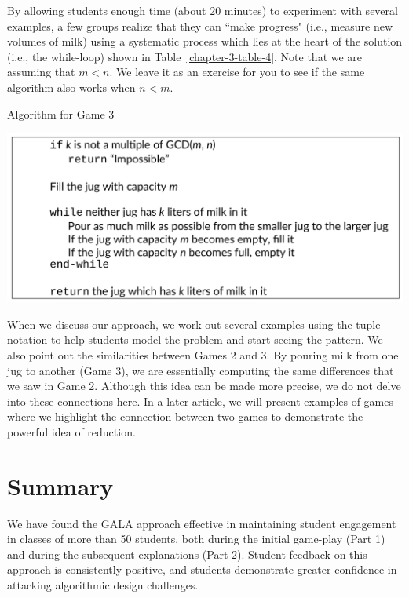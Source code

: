 \begin{multicols}{2}
By allowing students enough time (about 20 minutes) to experiment with several examples, a few groups realize that they can ``make progress" (i.e., measure new volumes of milk) using a systematic process which lies at the heart of the solution (i.e., the while-loop) shown in Table~\ref{chapter-3-table-4}. Note that we are assuming that $m < n$. We leave it as an exercise for you to see if the same algorithm also works when $n < m$.

\begin{table}[H]

\vspace{-.3cm}

\centering
\caption{Algorithm for Game 3}\label{chapter-3-table-4}
\includegraphics[scale=.6]{src/Figures/chap2/table4.jpg}
\end{table}

\vspace{-.5cm}

When we discuss our approach, we work out several examples using the tuple notation to help students model the problem and start seeing the pattern. We also point out the similarities between Games 2 and 3. By pouring milk from one jug to another (Game 3), we are essentially computing the same differences that we saw in Game 2. Although this idea can be made more precise, we do not delve into these connections here. In a later article, we will present examples of games where we highlight the connection between two games to demonstrate the powerful idea of reduction.

\vspace{-.3cm}

\section{Summary}

\vspace{-.2cm}

We have found the GALA approach effective in maintaining student engagement in classes of more than 50 students, both during the initial game-play (Part 1) and during the subsequent explanations (Part 2). Student feedback on this approach is consistently positive, and students demonstrate greater confidence in attacking algorithmic design challenges.


\end{multicols}

